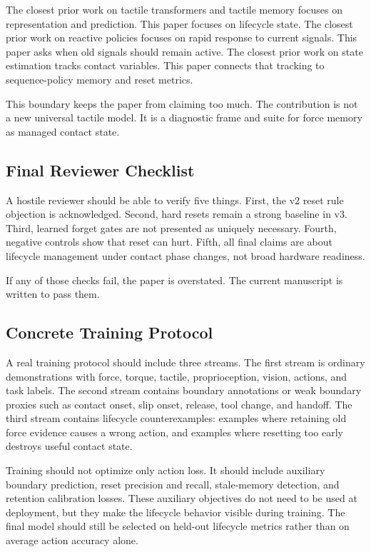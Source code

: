 \documentclass{article}
\begin{document}
The closest prior work on tactile transformers and tactile memory focuses on
representation and prediction. This paper focuses on lifecycle state. The
closest prior work on reactive policies focuses on rapid response to current
signals. This paper asks when old signals should remain active. The closest
prior work on state estimation tracks contact variables. This paper connects
that tracking to sequence-policy memory and reset metrics.

This boundary keeps the paper from claiming too much. The contribution is not a
new universal tactile model. It is a diagnostic frame and suite for force memory
as managed contact state.

\subsection{Final Reviewer Checklist}

A hostile reviewer should be able to verify five things. First, the v2 reset
rule objection is acknowledged. Second, hard resets remain a strong baseline in
v3. Third, learned forget gates are not presented as uniquely necessary.
Fourth, negative controls show that reset can hurt. Fifth, all final claims are
about lifecycle management under contact phase changes, not broad hardware
readiness.

If any of those checks fail, the paper is overstated. The current manuscript is
written to pass them.

\subsection{Concrete Training Protocol}

A real training protocol should include three streams. The first stream is
ordinary demonstrations with force, torque, tactile, proprioception, vision,
actions, and task labels. The second stream contains boundary annotations or
weak boundary proxies such as contact onset, slip onset, release, tool change,
and handoff. The third stream contains lifecycle counterexamples: examples
where retaining old force evidence causes a wrong action, and examples where
resetting too early destroys useful contact state.

Training should not optimize only action loss. It should include auxiliary
boundary prediction, reset precision and recall, stale-memory detection, and
retention calibration losses. These auxiliary objectives do not need to be used
at deployment, but they make the lifecycle behavior visible during training.
The final model should still be selected on held-out lifecycle metrics rather
than on average action accuracy alone.
\end{document}
